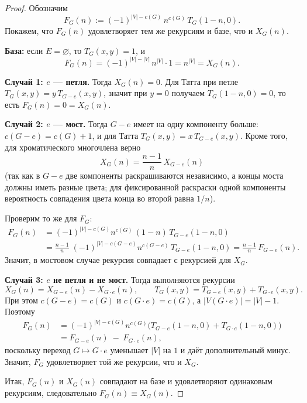 \begin{proof}
	Обозначим
	\[
	F_G(n):=(-1)^{|V|-c(G)}\,n^{c(G)}\,T_G(1-n,0).
	\]
	Покажем, что $F_G(n)$ удовлетворяет тем же рекурсиям и базе, что и $X_G(n)$.
	
	\smallskip
	\noindent\textbf{База:} если $E=\varnothing$, то $T_G(x,y)=1$, и
	\[
	F_G(n)=(-1)^{|V|-|V|}\,n^{|V|}\cdot 1=n^{|V|}=X_G(n).
	\]
	
	\smallskip
	\noindent\textbf{Случай 1: $e$ — петля.}
	Тогда $X_G(n)=0$. Для Татта при петле $T_G(x,y)=y\,T_{G-e}(x,y)$, значит при $y=0$
	получаем $T_G(1-n,0)=0$, то есть $F_G(n)=0=X_G(n)$.
	
	\smallskip
	\noindent\textbf{Случай 2: $e$ — мост.}
	Тогда $G-e$ имеет на одну компоненту больше: $c(G-e)=c(G)+1$, и для Татта
	$T_G(x,y)=x\,T_{G-e}(x,y)$. Кроме того, для хроматического многочлена верно
	\[
	X_G(n)=\frac{n-1}{n}\,X_{G-e}(n)
	\]
	(так как в $G-e$ две компоненты раскрашиваются независимо, а концы моста должны иметь разные цвета;
	для фиксированной раскраски одной компоненты вероятность совпадения цвета конца во второй равна $1/n$).
	
	Проверим то же для $F_G$:
	\begin{align*}
		F_G(n)
		&=(-1)^{|V|-c(G)}n^{c(G)}\,(1-n)\,T_{G-e}(1-n,0)\\
		&=\frac{n-1}{n}\;(-1)^{|V|-c(G-e)}n^{c(G-e)}\,T_{G-e}(1-n,0)
		=\frac{n-1}{n}\,F_{G-e}(n).
	\end{align*}
	Значит, в мостовом случае рекурсия совпадает с рекурсией для $X_G$.
	
	\smallskip
	\noindent\textbf{Случай 3: $e$ не петля и не мост.}
	Тогда выполняются рекурсии
	\[
	X_G(n)=X_{G-e}(n)-X_{G\cdot e}(n),
	\qquad
	T_G(x,y)=T_{G-e}(x,y)+T_{G\cdot e}(x,y).
	\]
	При этом $c(G-e)=c(G)$ и $c(G\cdot e)=c(G)$, а $|V(G\cdot e)|=|V|-1$. Поэтому
	\begin{align*}
		F_G(n)
		&=(-1)^{|V|-c(G)}n^{c(G)}\bigl(T_{G-e}(1-n,0)+T_{G\cdot e}(1-n,0)\bigr)\\
		&=F_{G-e}(n)\;-\;F_{G\cdot e}(n),
	\end{align*}
	поскольку переход $G\mapsto G\cdot e$ уменьшает $|V|$ на $1$ и даёт дополнительный минус.
	Значит, $F_G$ удовлетворяет той же рекурсии, что и $X_G$.
	
	\smallskip
	Итак, $F_G(n)$ и $X_G(n)$ совпадают на базе и удовлетворяют одинаковым рекурсиям,
	следовательно $F_G(n)\equiv X_G(n)$.
\end{proof}